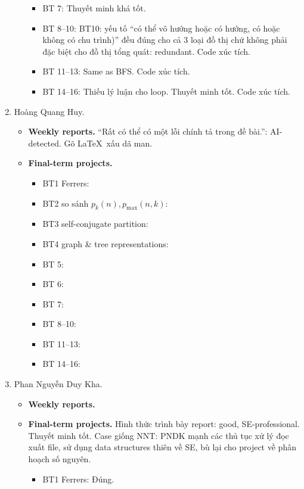 \documentclass{article}
\begin{document}
\begin{enumerate}
\begin{itemize}
\begin{itemize}
            \item BT 7: Thuyết minh khá tốt.
            \item BT 8--10: BT10: yếu tố ``có thể vô hướng hoặc có hướng, có hoặc không có chu trình)'' đều đúng cho cả 3 loại đồ thị chứ không phải đặc biệt cho đồ thị tổng quát: redundant. Code xúc tích.
            \item BT 11--13: Same as BFS. Code xúc tích.
            \item BT 14--16: Thiếu lý luận cho loop. Thuyết minh tốt. Code xúc tích.
        \end{itemize}
    \end{itemize}
    \item {\sc Hoàng Quang Huy.}
    \begin{itemize}
        \item {\bf Weekly reports.} ``Rất có thể có
        một lỗi chính tả trong đề bài.'': AI-detected. Gõ \LaTeX\ xấu dã man.
        \item {\bf Final-term projects.}
        \begin{itemize}
            \item BT1 Ferrers:
            \item BT2 so sánh $p_k(n),p_{\max}(n,k)$:
            \item BT3 self-conjugate partition:
            \item BT4 graph \& tree representations:
            \item BT 5:
            \item BT 6:
            \item BT 7:
            \item BT 8--10:
            \item BT 11--13:
            \item BT 14--16:
        \end{itemize}
    \end{itemize}
    \item {\sc Phan Nguyễn Duy Kha.}
    \begin{itemize}
        \item {\bf Weekly reports.}
        \item {\bf Final-term projects.} Hình thức trình bày report: good, SE-professional. Thuyết minh tốt. Case giống NNT: PNDK mạnh các thủ tục xử lý đọc xuất file, sử dụng data structures thiên về SE, bù lại cho project về phân hoạch số nguyên.
        \begin{itemize}
            \item BT1 Ferrers: Đúng.

\end{itemize}
\end{itemize}
\end{enumerate}
\end{document}
